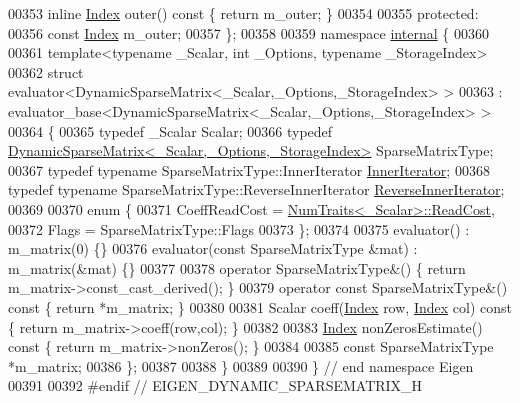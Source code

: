 \begin{DoxyCode}
00353     \textcolor{keyword}{inline} \hyperlink{group___core___module_a554f30542cc2316add4b1ea0a492ff02}{Index} outer()\textcolor{keyword}{ const }\{ \textcolor{keywordflow}{return} m\_outer; \}
00354 
00355   \textcolor{keyword}{protected}:
00356     \textcolor{keyword}{const} \hyperlink{group___core___module_a554f30542cc2316add4b1ea0a492ff02}{Index} m\_outer;
00357 \};
00358 
00359 \textcolor{keyword}{namespace }\hyperlink{namespaceinternal}{internal} \{
00360 
00361 \textcolor{keyword}{template}<\textcolor{keyword}{typename} \_Scalar, \textcolor{keywordtype}{int} \_Options, \textcolor{keyword}{typename} \_StorageIndex>
00362 \textcolor{keyword}{struct }evaluator<DynamicSparseMatrix<\_Scalar,\_Options,\_StorageIndex> >
00363   : evaluator\_base<DynamicSparseMatrix<\_Scalar,\_Options,\_StorageIndex> >
00364 \{
00365   \textcolor{keyword}{typedef} \_Scalar Scalar;
00366   \textcolor{keyword}{typedef} \hyperlink{class_eigen_1_1_dynamic_sparse_matrix}{DynamicSparseMatrix<\_Scalar,\_Options,\_StorageIndex>}
       SparseMatrixType;
00367   \textcolor{keyword}{typedef} \textcolor{keyword}{typename} SparseMatrixType::InnerIterator \hyperlink{class_eigen_1_1_dynamic_sparse_matrix_1_1_inner_iterator}{InnerIterator};
00368   \textcolor{keyword}{typedef} \textcolor{keyword}{typename} SparseMatrixType::ReverseInnerIterator \hyperlink{class_eigen_1_1_dynamic_sparse_matrix_1_1_reverse_inner_iterator}{ReverseInnerIterator};
00369   
00370   \textcolor{keyword}{enum} \{
00371     CoeffReadCost = \hyperlink{group___core___module_struct_eigen_1_1_num_traits}{NumTraits<\_Scalar>::ReadCost},
00372     Flags = SparseMatrixType::Flags
00373   \};
00374   
00375   evaluator() : m\_matrix(0) \{\}
00376   evaluator(\textcolor{keyword}{const} SparseMatrixType &mat) : m\_matrix(&mat) \{\}
00377   
00378   \textcolor{keyword}{operator} SparseMatrixType&() \{ \textcolor{keywordflow}{return} m\_matrix->const\_cast\_derived(); \}
00379   \textcolor{keyword}{operator} \textcolor{keyword}{const} SparseMatrixType&() \textcolor{keyword}{const} \{ \textcolor{keywordflow}{return} *m\_matrix; \}
00380   
00381   Scalar coeff(\hyperlink{group___core___module_a554f30542cc2316add4b1ea0a492ff02}{Index} row, \hyperlink{group___core___module_a554f30542cc2316add4b1ea0a492ff02}{Index} col)\textcolor{keyword}{ const }\{ \textcolor{keywordflow}{return} m\_matrix->coeff(row,col); \}
00382   
00383   \hyperlink{group___core___module_a554f30542cc2316add4b1ea0a492ff02}{Index} nonZerosEstimate()\textcolor{keyword}{ const }\{ \textcolor{keywordflow}{return} m\_matrix->nonZeros(); \}
00384 
00385   \textcolor{keyword}{const} SparseMatrixType *m\_matrix;
00386 \};
00387 
00388 \}
00389 
00390 \} \textcolor{comment}{// end namespace Eigen}
00391 
00392 \textcolor{preprocessor}{#endif // EIGEN\_DYNAMIC\_SPARSEMATRIX\_H}
\end{DoxyCode}
